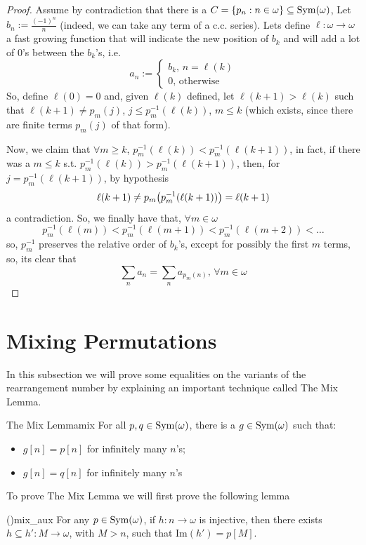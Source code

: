 \begin{proof}
    Assume by contradiction that there is a $C=\{p_n:n\in\omega\}\subseteq\mathrm{Sym}(\omega)$, Let $b_n:=\frac{(-1)^n}{n}$ (indeed, we can take any term of a c.c. series). Lets define $\ell:\omega\to\omega$ a fast growing function that will indicate the new position of $b_k$ and will add a lot of $0$'s between the $b_k$'s, i.e.
    $$a_n:=\begin{cases}
        b_k,\, n=\ell(k)\\
        0,\, \text{otherwise}
    \end{cases}$$
    So, define $\ell(0)=0$ and, given $\ell(k)$ defined, let $\ell(k+1)>\ell(k)$ such that $\ell(k+1)\neq p_m(j)$, $j\leq p_m^{-1}(\ell(k))$, $m\leq k$ (which exists, since there are finite terms $p_m(j)$ of that form).

    Now, we claim that $\forall m\geq k$, $p_m^{-1}(\ell(k))<p_m^{-1}(\ell(k+1))$, in fact, if there was a $m\leq k$ s.t. $p_m^{-1}(\ell(k))>p_m^{-1}(\ell(k+1))$, then, for $j=p_m^{-1}(\ell(k+1))$, by hypothesis
    $$\ell(k+1)\neq p_m{\left(p_m^{-1}(\ell(k+1))\right)}=\ell(k+1)$$
    a contradiction. So, we finally have that, $\forall m\in\omega$
    $$p_m^{-1}(\ell(m))<p_m^{-1}(\ell(m+1))<p_m^{-1}(\ell(m+2))<\dots$$
    so, $p_m^{-1}$ preserves the relative order of $b_k$'s, except for possibly the first $m$ terms, so, its clear that
    $$\sum_n a_n=\sum_n a_{p_m(n)},\,\forall m\in\omega$$
\end{proof}

\section{Mixing Permutations}
In this subsection we will prove some equalities on the variants of the rearrangement number by explaining an important technique called The Mix Lemma.

\begin{lemma}{The Mix Lemma}{mix}
    For all $p,q\in\mathrm{Sym}(\omega)$, there is a $g\in\mathrm{Sym}(\omega)$ such that:
    \begin{itemize}
        \item $g[n]=p[n]$ for infinitely many $n$'s;
        \item $g[n]=q[n]$ for infinitely many $n$'s
    \end{itemize}
\end{lemma}

To prove The Mix Lemma we will first prove the following lemma

\begin{lemma}{(\cite{blass})}{mix_aux}
    For any $p\in\mathrm{Sym}(\omega)$, if $h:n\to\omega$ is injective, then there exists $h\subseteq h':M\to\omega$, with $M>n$, such that $\text{Im}(h')=p[M]$.
\end{lemma}

